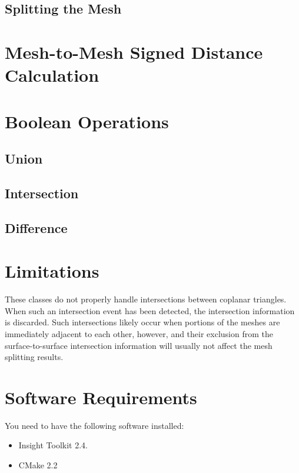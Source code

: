 \documentclass{InsightArticle}
\begin{document}
\subsection{Splitting the Mesh}



\section{Mesh-to-Mesh Signed Distance Calculation}

\section{Boolean Operations}

\subsection{Union}

\subsection{Intersection}

\subsection{Difference}

\section{Limitations}

These classes do not properly handle intersections between coplanar triangles. When such an intersection event has been detected, the intersection information is discarded. Such intersections likely occur when portions of the meshes are immediately adjacent to each other, however, and their exclusion from the surface-to-surface intersection information will usually not affect the mesh splitting results.

\section{Software Requirements}

You need to have the following software installed:

\begin{itemize}
  \item  Insight Toolkit 2.4.
  \item  CMake 2.2
\end{itemize}
\end{document}
